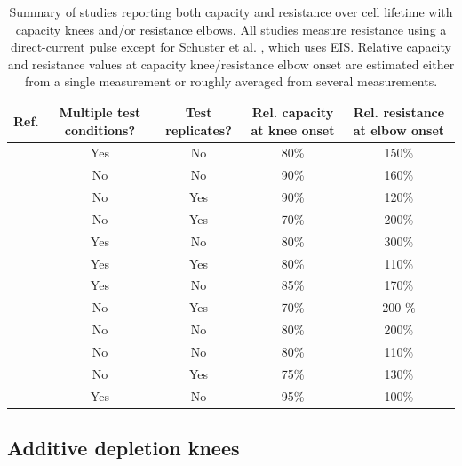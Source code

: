 \documentclass[journal=jpcl, manuscript=article, layout=onecolumn]{achemso}
\begin{document}
\begin{table}[!ht]
    \centering
    \begin{tabular}{||c||c|c|c|c||}
        \hline
        Ref. & Multiple test conditions? & Test replicates? & Rel. capacity at knee onset & Rel. resistance at elbow onset \\
        \hline
        \cite{ecker_calendar_2014} & Yes & No & 80\% & 150\% \\
        \cite{rahe_nanoscale_2019} & No & No & 90\% & 160\% \\
        \cite{willenberg_development_2020} & No & Yes & 90\% & 120\% \\
        \cite{broussely_main_2005} & No & Yes & 70\% & 200\% \\
        \cite{schuster_nonlinear_2015} & Yes & No & 80\% & 300\% \\
        \cite{lewerenz_systematic_2017, lewerenz_post-mortem_2017} & Yes & Yes & 80\% & 110\% \\
        \cite{martinez-laserna_technical_2018} & Yes & No &  85\% & 170\% \\
        \cite{braco_experimental_2020} & No & Yes & 70\% & 200 \% \\
        \cite{frisco_understanding_2016} & No & No & 80\% & 200\% \\
        \cite{klett_non-uniform_2014} & No & No & 80\% & 110\% \\
        \cite{pfrang_long-term_2018} & No & Yes & 75\% & 130\% \\
        \cite{wunsch_investigation_2019} & Yes & No & 95\% & 100\% \\
        \hline
    \end{tabular}
    \caption{Summary of studies reporting both capacity and resistance over cell lifetime with capacity knees and/or resistance elbows. All studies measure resistance using a direct-current pulse except for Schuster et al. \cite{schuster_nonlinear_2015}, which uses EIS. Relative capacity and resistance values at capacity knee/resistance elbow onset are estimated either from a single measurement or roughly averaged from several measurements.}
    \label{tab:dcr_growth_papers}
\end{table}



\subsection{Additive depletion knees}
\end{document}
